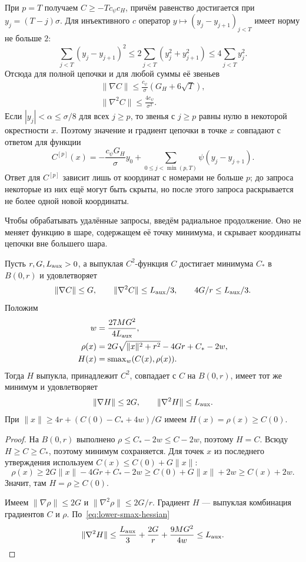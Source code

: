 При $p=T$ получаем $C\ge-Tc_{\psi}c_H$, причём равенство достигается
при $y_j=(T-j)\sigma$. Для инъективного $c$ оператор
$y\mapsto(y_j-y_{j+1})_{j<T}$ имеет норму не больше $2$:
\[
 \sum_{j<T}(y_j-y_{j+1})^2
 \le2\sum_{j<T}(y_j^2+y_{j+1}^2)
 \le4\sum_{j<T}y_j^2.
\]
Отсюда для полной цепочки и для любой суммы её звеньев
\begin{equation}
\label{eq:lower-chain-bounds}
 \begin{gathered}
 \|\nabla C\|\le \frac{c_{\psi}}{\sigma}(G_H+6\sqrt T),\\
 \|\nabla^2C\|\le\frac{4c_{\psi}}{\sigma^2}.
 \end{gathered}
\end{equation}
Если $|y_j|<\alpha\le\sigma/8$ для всех $j\ge p$, то звенья
с $j\ge p$ равны нулю в некоторой окрестности $x$.
Поэтому значение и градиент цепочки в точке $x$ совпадают с ответом для функции
\[
 C^{[p]}(x)=-\frac{c_{\psi}G_H}{\sigma}y_0+\sum_{0\le j<\min(p,T)}\psi(y_j-y_{j+1}).
\]
Ответ для $C^{[p]}$ зависит лишь от координат с номерами не больше $p$;
до запроса некоторые из них ещё могут быть скрыты, но после этого запроса
раскрывается не более одной новой координаты.

Чтобы обрабатывать удалённые запросы, введём радиальное продолжение.
Оно не меняет функцию в шаре, содержащем её точку минимума,
и скрывает координаты цепочки вне большего шара.

\begin{lemma}\label{lem:lower-radial}
Пусть $r,G,L_{\rm aux}>0$, а выпуклая $C^2$-функция $C$
достигает минимума $C_\ast$ в $B(0,r)$ и удовлетворяет
\[
 \|\nabla C\|\le G,\qquad
 \|\nabla^2C\|\le L_{\rm aux}/3,\qquad
 4G/r\le L_{\rm aux}/3.
\]
Положим
\begin{equation}\label{eq:lower-mask-S}
 \begin{aligned}
 w&=\frac{27MG^2}{4L_{\rm aux}},\\
 \rho(x)&=2G\sqrt{\|x\|^2+r^2}-4Gr+C_\ast-2w,\\
 H(x)&=\operatorname{smax}_w(C(x),\rho(x)).
 \end{aligned}
\end{equation}
Тогда $H$ выпукла, принадлежит $C^2$, совпадает с $C$ на $B(0,r)$,
имеет тот же минимум и удовлетворяет
\[
 \|\nabla H\|\le2G,\qquad \|\nabla^2H\|\le L_{\rm aux}.
\]
При $\|x\|\ge4r+(C(0)-C_\ast+4w)/G$ имеем $H(x)=\rho(x)\ge C(0)$.
\end{lemma}

\begin{proof}
На $B(0,r)$ выполнено $\rho\le C_\ast-2w\le C-2w$, поэтому $H=C$.
Всюду $H\ge C\ge C_\ast$, поэтому минимум сохраняется.
Для точек $x$ из последнего утверждения используем $C(x)\le C(0)+G\|x\|$:
\[
 \rho(x)\ge2G\|x\|-4Gr+C_\ast-2w
 \ge C(0)+G\|x\|+2w\ge C(x)+2w.
\]
Значит, там $H=\rho\ge C(0)$.

Имеем $\|\nabla\rho\|\le2G$ и $\|\nabla^2\rho\|\le2G/r$.
Градиент $H$ --- выпуклая комбинация градиентов $C$ и $\rho$.
По~\eqref{eq:lower-smax-hessian}
\[
 \|\nabla^2H\|\le\frac{L_{\rm aux}}3+\frac{2G}{r}
 +\frac{9MG^2}{4w}\le L_{\rm aux}.
\]
\end{proof}

